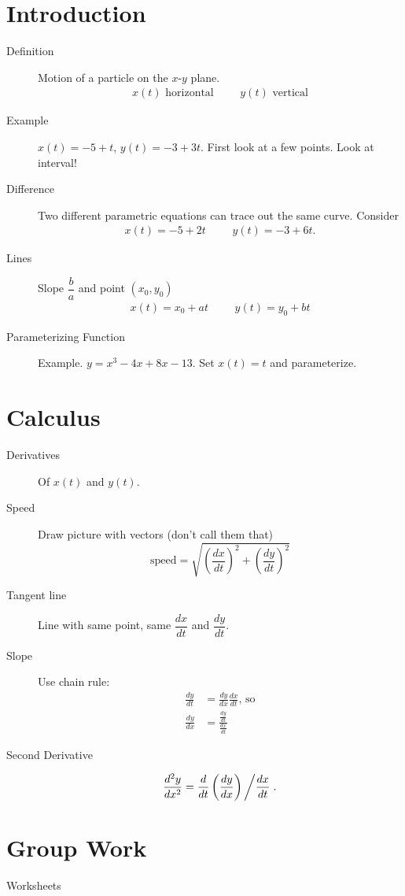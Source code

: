 \documentclass[11pt]{article}
\begin{document}
\drawtitle

\section*{Introduction}
\begin{description}
\item[Definition] Motion of a particle on the $x$-$y$ plane.
  \begin{align*}
    x(t)\mbox{ horizontal} &&& y(t)\mbox{ vertical}
  \end{align*}
\item[Example] $x(t) = -5 + t$, $y(t) = -3 + 3t$.  First look at a few
  points.  Look at interval!
\item[Difference] Two different parametric equations can trace out the
  same curve.  Consider
  \begin{align*}
    x(t)= -5 + 2t &&&  y(t)= -3 + 6t.
  \end{align*}
\item[Lines] Slope $\dfrac{b}{a}$ and point $(x_0,y_0)$
  \begin{align*}
    x(t)=x_0+at &&& y(t)=y_0+bt
  \end{align*}
\item[Parameterizing Function] Example. $y=x^3-4x+8x-13$.  Set
  $x(t)=t$ and parameterize.
\end{description}

\section*{Calculus}

\begin{description}
\item[Derivatives] Of $x(t)$ and $y(t)$. 
\item[Speed] Draw picture with vectors (don't call them that)
  \[
  \mbox{speed} = \sqrt{\left(\frac{dx}{dt}\right)^2 +
    \left(\frac{dy}{dt}\right)^2}
  \]
\item[Tangent line] Line with same point, same $\dfrac{dx}{dt}$ and
  $\dfrac{dy}{dt}$.
\item[Slope] Use chain rule:
  \begin{align*}
    \frac{dy}{dt} &=\frac{dy}{dx}\frac{dx}{dt} \text{, so}\\
    \frac{dy}{dx} &=\frac{\frac{dy}{dt}}{\frac{dx}{dt}}
  \end{align*}
\item[Second Derivative]
  \[ \frac{d^2y}{dx^2} = \frac{d}{dt} \left(\frac{dy}{dx}\right)
  \left/\frac{dx}{dt}\right..
  \]
\end{description}

\section*{Group Work}
\begin{description}
\item[Worksheets]
\end{description}
\end{document}
